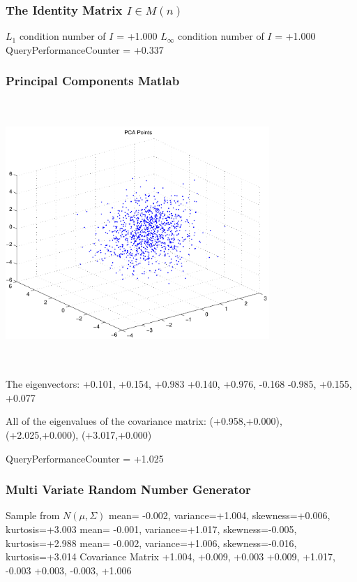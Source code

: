 \documentclass[9pt]{article}
\theoremstyle{plain}
\theoremstyle{definition}
\theoremstyle{remark}
\numberwithin{equation}{section}
\begin{document}
\subsubsection{The Identity Matrix $I \in M(n)$}
$L_1$ condition number of $I$ = +1.000
$L_\infty$ condition number of $I$ = +1.000
QueryPerformanceCounter  =  +0.337
\subsubsection{Principal Components Matlab }
\includegraphics[width=10.0cm,height=10.0cm]{PCAPoints.pdf}

The eigenvectors:
+0.101, +0.154, +0.983
+0.140, +0.976, -0.168
-0.985, +0.155, +0.077

All of the eigenvalues of the covariance matrix:
(+0.958,+0.000), (+2.025,+0.000), (+3.017,+0.000)

QueryPerformanceCounter  =  +1.025
\subsubsection{Multi Variate Random Number Generator }
Sample from $N(\mu,\Sigma)$
mean= -0.002, variance=+1.004, skewness=+0.006, kurtosis=+3.003
mean= -0.001, variance=+1.017, skewness=-0.005, kurtosis=+2.988
mean= -0.002, variance=+1.006, skewness=-0.016, kurtosis=+3.014
Covariance Matrix 
+1.004, +0.009, +0.003
+0.009, +1.017, -0.003
+0.003, -0.003, +1.006
\end{document}
